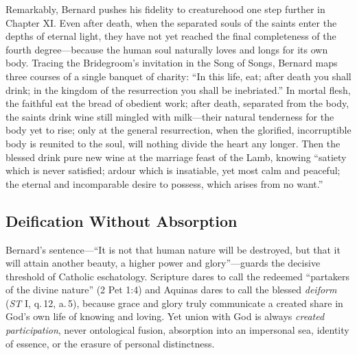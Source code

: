 Remarkably, Bernard pushes his fidelity to creaturehood one step further in Chapter XI. Even after death, when the separated souls of the saints enter the depths of eternal light, they have not yet reached the final completeness of the fourth degree---because the human soul naturally loves and longs for its own body. Tracing the Bridegroom's invitation in the Song of Songs, Bernard maps three courses of a single banquet of charity: ``In this life, eat; after death you shall drink; in the kingdom of the resurrection you shall be inebriated.'' In mortal flesh, the faithful eat the bread of obedient work; after death, separated from the body, the saints drink wine still mingled with milk---their natural tenderness for the body yet to rise; only at the general resurrection, when the glorified, incorruptible body is reunited to the soul, will nothing divide the heart any longer. Then the blessed drink pure new wine at the marriage feast of the Lamb, knowing ``satiety which is never satisfied; ardour which is insatiable, yet most calm and peaceful; the eternal and incomparable desire to possess, which arises from no want.''

\subsection*{Deification Without Absorption}

Bernard's sentence---``It is not that human nature will be destroyed, but that it will attain another beauty, a higher power and glory''---guards the decisive threshold of Catholic eschatology. Scripture dares to call the redeemed ``partakers of the divine nature'' (2 Pet 1:4) and Aquinas dares to call the blessed \emph{deiform} (\emph{ST} I, q.\,12, a.\,5), because grace and glory truly communicate a created share in God's own life of knowing and loving. Yet union with God is always \emph{created participation}, never ontological fusion, absorption into an impersonal sea, identity of essence, or the erasure of personal distinctness.

